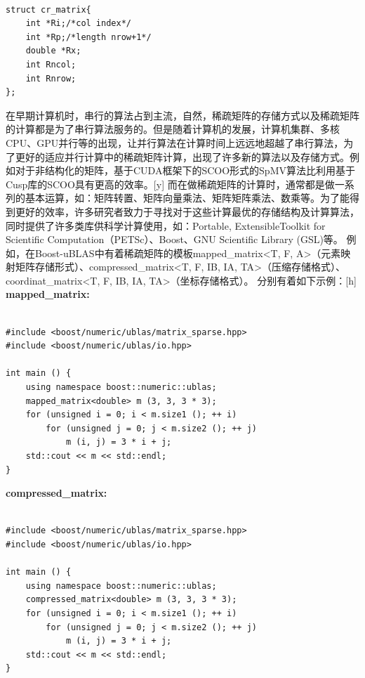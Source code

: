 \documentclass{article}
\begin{document}
\begin{lstlisting}

struct cr_matrix{ 
	int *Ri;/*col index*/ 
	int *Rp;/*length nrow+1*/ 
	double *Rx; 
	int Rncol;
	int Rnrow;
};

\end{lstlisting}


在早期计算机时，串行的算法占到主流，自然，稀疏矩阵的存储方式以及稀疏矩阵的计算都是为了串行算法服务的。但是随着计算机的发展，计算机集群、多核CPU、GPU并行等的出现，让并行算法在计算时间上远远地超越了串行算法，为了更好的适应并行计算中的稀疏矩阵计算，出现了许多新的算法以及存储方式。例如对于非结构化的矩阵，基于CUDA框架下的SCOO形式的SpMV算法比利用基于Cusp库的SCOO具有更高的效率。[y]
\newline
而在做稀疏矩阵的计算时，通常都是做一系列的基本运算，如：矩阵转置、矩阵向量乘法、矩阵矩阵乘法、数乘等。为了能得到更好的效率，许多研究者致力于寻找对于这些计算最优的存储结构及计算算法，同时提供了许多类库供科学计算使用，如：Portable, ExtensibleToolkit for Scientific Computation（PETSc）、Boost、GNU Scientific Library (GSL)等。\newline
例如，在Boost-uBLAS中有着稀疏矩阵的模板mapped\_matrix<T, F, A>（元素映射矩阵存储形式）、compressed\_matrix<T, F, IB, IA, TA>（压缩存储格式）、coordinat\_matrix<T, F, IB, IA, TA>（坐标存储格式）。
分别有着如下示例：[h]\newline
\textbf{mapped\_matrix:}
\begin{lstlisting}

#include <boost/numeric/ublas/matrix_sparse.hpp>
#include <boost/numeric/ublas/io.hpp>

int main () {
    using namespace boost::numeric::ublas;
    mapped_matrix<double> m (3, 3, 3 * 3);
    for (unsigned i = 0; i < m.size1 (); ++ i)
        for (unsigned j = 0; j < m.size2 (); ++ j)
            m (i, j) = 3 * i + j;
    std::cout << m << std::endl;
}

\end{lstlisting}

\textbf{compressed\_matrix:}
\begin{lstlisting}

#include <boost/numeric/ublas/matrix_sparse.hpp>
#include <boost/numeric/ublas/io.hpp>

int main () {
    using namespace boost::numeric::ublas;
    compressed_matrix<double> m (3, 3, 3 * 3);
    for (unsigned i = 0; i < m.size1 (); ++ i)
        for (unsigned j = 0; j < m.size2 (); ++ j)
            m (i, j) = 3 * i + j;
    std::cout << m << std::endl;
}

\end{lstlisting}
\end{document}

